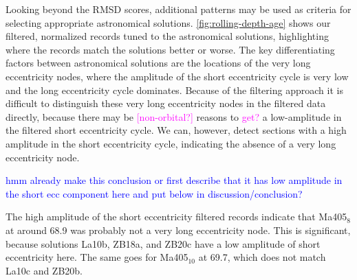 \documentclass[draft]{agujournal2019}
\newcommand{\rez}{\textcolor{magenta}}
\newcommand{\ijk}{\textcolor{blue}}
\begin{document}
Looking beyond the \gls{RMSD} scores, additional patterns may be used as criteria for selecting appropriate astronomical solutions.
\cref{fig:rolling-depth-age} shows our filtered, normalized records tuned to the astronomical solutions, highlighting where the records match the solutions better or worse.
The key differentiating factors between astronomical solutions are the locations of the very long eccentricity nodes, where the amplitude of the short eccentricity cycle is very low and the long eccentricity cycle dominates.
Because of the filtering approach it is difficult to distinguish these very long eccentricity nodes in the filtered data directly, because there may be \rez{[non-orbital?]} reasons to \rez{get?} a low-amplitude in the filtered short eccentricity cycle.
We can, however, detect sections with a high amplitude in the short eccentricity cycle, indicating the absence of a very long eccentricity node.

\ijk{hmm already make this conclusion or first describe that it has low amplitude in the short ecc component here and put below in discussion/conclusion?}

The high amplitude of the short eccentricity filtered records indicate that Ma405\(_{8}\) at around \qty{68.9}{\millionyearago} was probably not a very long eccentricity node.
This is significant, because solutions La10b, ZB18a, and ZB20c have a low amplitude of short eccentricity here.
The same goes for Ma405\(_{10}\) at \qty{69.7}{\millionyearago}, which does not match La10c and ZB20b.
\end{document}
